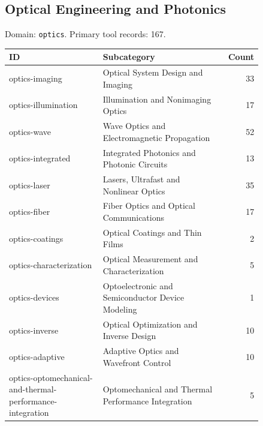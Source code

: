 \subsection{Optical Engineering and Photonics}
\noindent Domain: \texttt{optics}. Primary tool records: 167.
\begin{longtable}{p{0.37\linewidth}p{0.47\linewidth}r}
ID & Subcategory & Count\\\hline\endhead
optics-imaging & Optical System Design and Imaging & 33\\
optics-illumination & Illumination and Nonimaging Optics & 17\\
optics-wave & Wave Optics and Electromagnetic Propagation & 52\\
optics-integrated & Integrated Photonics and Photonic Circuits & 13\\
optics-laser & Lasers, Ultrafast and Nonlinear Optics & 35\\
optics-fiber & Fiber Optics and Optical Communications & 17\\
optics-coatings & Optical Coatings and Thin Films & 2\\
optics-characterization & Optical Measurement and Characterization & 5\\
optics-devices & Optoelectronic and Semiconductor Device Modeling & 1\\
optics-inverse & Optical Optimization and Inverse Design & 10\\
optics-adaptive & Adaptive Optics and Wavefront Control & 10\\
optics-optomechanical-and-thermal-performance-integration & Optomechanical and Thermal Performance Integration & 5\\
\end{longtable}
